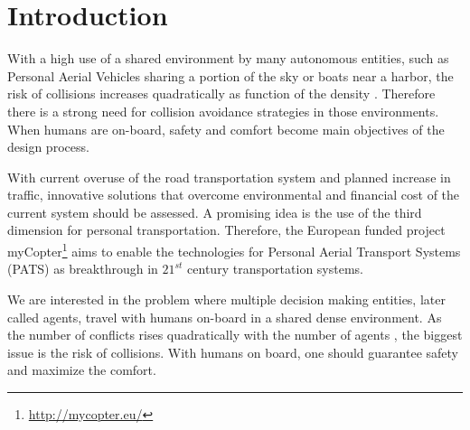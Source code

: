 \section{Introduction}

With a high use of a shared environment by many autonomous entities, such as Personal Aerial Vehicles sharing a portion of the sky or boats near a harbor, the risk of collisions increases quadratically as function of the density \cite{jardin_analytical_2005}. Therefore there is a strong need for collision avoidance strategies in those environments. When humans are on-board, safety and comfort become main objectives of the design process. 

With current overuse of the road transportation system and planned increase in traffic\cite{truman_out_2007}, innovative solutions that overcome environmental and financial cost of the current system should be assessed. A promising idea is the use of the third dimension for personal transportation. Therefore, the European funded project myCopter\cite{jump_mycopter:_2011}\footnote{\url{http://mycopter.eu/}} aims to enable the technologies for Personal Aerial Transport Systems (PATS) as breakthrough in $21^{st}$ century transportation systems. 

We are interested in the problem where multiple decision making entities, later called agents, travel with humans on-board in a shared dense environment. As the number of conflicts rises quadratically with the number of agents \cite{jardin_analytical_2005}, the biggest issue is the risk of collisions. With humans on board, one should guarantee safety and maximize the comfort. 



